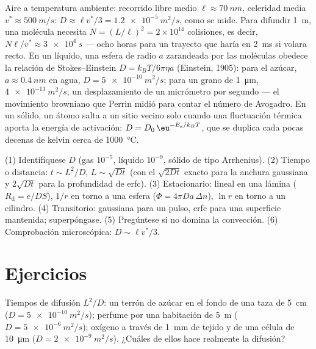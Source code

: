 \begin{example}\label{ex:b2:particle-diffusion:kinetic}
Aire a temperatura ambiente: recorrido libre medio $\ell \approx \qty{70}{nm}$,
celeridad media $v^* \approx \qty{500}{m/s}$: $D \approx \ell v^*/3 =
\qty{1.2e-5}{m^2/s}$, como se mide. Para difundir \qty{1}{m}, una molécula
necesita $N = (L/\ell)^2 = 2 \times 10^{14}$ colisiones, es decir, $N\ell/v^*
\approx \qty{3e4}{s}$ --- ocho horas para un trayecto que haría en
\qty{2}{ms} si volara recto. En un líquido, una esfera de radio $a$
zarandeada por las moléculas obedece la relación de Stokes--Einstein $D =
k_BT/6\pi\eta a$ (Einstein, 1905): para el azúcar, $a \approx \qty{0.4}{nm}$
en agua, $D = \qty{5e-10}{m^2/s}$; para un grano de \qty{1}{\micro m},
$\qty{4e-13}{m^2/s}$, un desplazamiento de un micrómetro por segundo ---
el movimiento browniano que Perrin midió para contar el número de Avogadro. En
un sólido, un átomo salta a un sitio vecino solo cuando una fluctuación
térmica aporta la energía de activación: $D = D_0\,\eu^{-E_{\text{a}}/k_BT}$,
que se duplica cada pocas decenas de kelvin cerca de \qty{1000}{\celsius}.
\end{example}

\begin{method}\label{meth:b2:particle-diffusion:method}
(1) Identifíquese $D$ (gas $10^{-5}$, líquido $10^{-9}$, sólido de tipo Arrhenius).
(2) Tiempo o distancia: $t \sim L^2/D$, $L \sim \sqrt{Dt}$ (con el
$\sqrt{2Dt}$ exacto para la anchura gaussiana y $2\sqrt{Dt}$ para la profundidad de erfc).
(3) Estacionario: lineal en una lámina ($R_{\text{d}} = e/DS$), $1/r$ en torno a una
esfera ($\Phi = 4\pi D a\,\Delta n$), $\ln r$ en torno a un cilindro. (4)
Transitorio: gaussiana para un pulso, erfc para una superficie mantenida; superpóngase.
(5) Pregúntese si no domina la convección. (6) Comprobación microscópica:
$D \sim \ell v^*/3$.
\end{method}

\section{Ejercicios}

\begin{exercise}[$\star$]\label{exo:b2:particle-diffusion:1}
Tiempos de difusión $L^2/D$: un terrón de azúcar en el fondo de una taza de \qty{5}{cm}
($D = \qty{5e-10}{m^2/s}$); perfume por una habitación de \qty{5}{m} ($D =
\qty{5e-6}{m^2/s}$); oxígeno a través de \qty{1}{mm} de tejido y de una
célula de \qty{10}{\micro m} ($D = \qty{2e-9}{m^2/s}$). ¿Cuáles de ellos hace
realmente la difusión?
\end{exercise}

